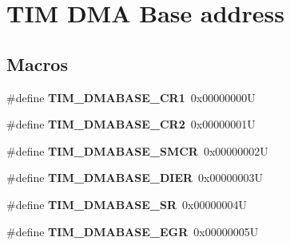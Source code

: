 \hypertarget{group___t_i_m___d_m_a___base__address}{}\section{T\+IM D\+MA Base address}
\label{group___t_i_m___d_m_a___base__address}
\subsection*{Macros}
\begin{DoxyCompactItemize}
\item 
\mbox{\label{group___t_i_m___d_m_a___base__address_ga97bbe74e5ae8680c020a6b0f760d8909}} 
\#define {\bfseries T\+I\+M\+\_\+\+D\+M\+A\+B\+A\+S\+E\+\_\+\+C\+R1}~0x00000000U
\item 
\mbox{\label{group___t_i_m___d_m_a___base__address_ga53d60ce92015bb60d608e60c45b1fdda}} 
\#define {\bfseries T\+I\+M\+\_\+\+D\+M\+A\+B\+A\+S\+E\+\_\+\+C\+R2}~0x00000001U
\item 
\mbox{\label{group___t_i_m___d_m_a___base__address_ga184ad86a4c6d48263f57d3e7106675c4}} 
\#define {\bfseries T\+I\+M\+\_\+\+D\+M\+A\+B\+A\+S\+E\+\_\+\+S\+M\+CR}~0x00000002U
\item 
\mbox{\label{group___t_i_m___d_m_a___base__address_ga137d2e3858ae68333646fea6e04503da}} 
\#define {\bfseries T\+I\+M\+\_\+\+D\+M\+A\+B\+A\+S\+E\+\_\+\+D\+I\+ER}~0x00000003U
\item 
\mbox{\label{group___t_i_m___d_m_a___base__address_gaf0da2213e3e7b6aaaa9b738ec85abc02}} 
\#define {\bfseries T\+I\+M\+\_\+\+D\+M\+A\+B\+A\+S\+E\+\_\+\+SR}~0x00000004U
\item 
\mbox{\label{group___t_i_m___d_m_a___base__address_gaff6d230aafb918047d62e877d21b3bdc}} 
\#define {\bfseries T\+I\+M\+\_\+\+D\+M\+A\+B\+A\+S\+E\+\_\+\+E\+GR}~0x00000005U
\item 
\mbox{\label{group___t_i_m___d_m_a___base__address_gac94d74bf77d5ce139c7fa6e0b8c2da44}} 

\end{DoxyCompactItemize}
